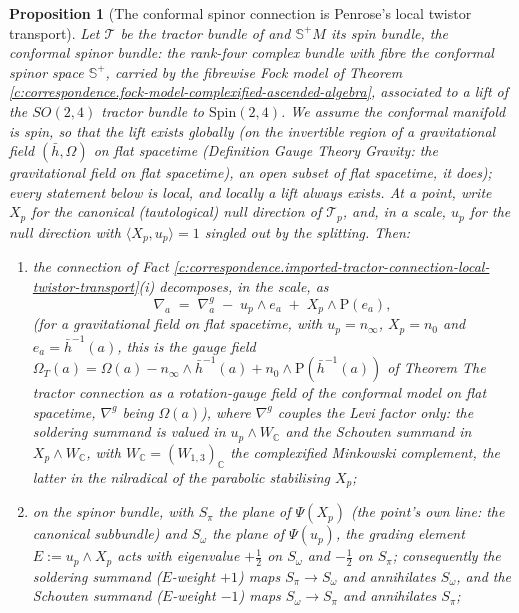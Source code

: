 \documentclass[11pt]{article}
\newtheorem{proposition}[theorem]{Proposition}
\theoremstyle{definition}
\theoremstyle{plain}
\newcommand{\changedmark}[2]{\marginpar{\raggedright\scriptsize\color{#1}#2}}
\providecommand{\C}{}\renewcommand{\C}{\mathbb{C}}
\providecommand{\CS}{}\renewcommand{\CS}{{\mathbb{S}^{+}}}
\providecommand{\Sch}{}\renewcommand{\Sch}{\mathrm{P}}
\providecommand{\Som}{}\renewcommand{\Som}{S_\omega}
\providecommand{\Spi}{}\renewcommand{\Spi}{S_\pi}
\providecommand{\hb}{}\renewcommand{\hb}{\bar{h}}
\providecommand{\nInf}{}\renewcommand{\nInf}{n_\infty}
\providecommand{\nO}{}\renewcommand{\nO}{n_0}
\providecommand{\ip}{}\renewcommand{\ip}[2]{\langle #1, #2\rangle}
\begin{document}
\begin{proposition}[The conformal spinor connection is Penrose's local twistor transport]\label{c:correspondence.local-twistor-transport-ascended-spinor-connection}
\changedmark{gray}{reworded}
Let $\mathcal{T}$ be the tractor bundle of \cite[\S 4]{ButlerT6} and $\CS M$ its spin bundle, the conformal spinor bundle: the rank-four complex bundle with fibre the conformal spinor space $\CS$, carried by the fibrewise Fock model of Theorem \ref{c:correspondence.fock-model-complexified-ascended-algebra}, associated to a lift of the $SO(2,4)$ tractor bundle to $\mathrm{Spin}(2,4)$. We assume the conformal manifold is spin, so that the lift exists globally (on the invertible region of a gravitational field $(\hb, \Omega)$ on flat spacetime (Definition \emph{Gauge Theory Gravity: the gravitational field on flat spacetime}), an open subset of flat spacetime, it does); every statement below is local, and locally a lift always exists. At a point, write $X_p$ for the canonical (tautological) null direction of $\mathcal{T}_p$, and, in a scale, $u_p$ for the null direction with $\ip{X_p}{u_p} = 1$ singled out by the splitting. Then:
\begin{enumerate}
\item the connection of Fact \ref{c:correspondence.imported-tractor-connection-local-twistor-transport}(i) decomposes, in the scale, as
\[
\nabla_a \;=\; \nabla^{g}_a \;-\; u_p \wedge e_a \;+\; X_p \wedge \mathrm{P}(e_a),
\]
(for a gravitational field on flat spacetime, with $u_p = \nInf$, $X_p = \nO$ and $e_a = \hb^{-1}(a)$, this is the gauge field $\Omega_{T}(a) = \Omega(a) - \nInf \wedge \hb^{-1}(a) + \nO \wedge \Sch(\hb^{-1}(a))$ of Theorem \emph{The tractor connection as a rotation-gauge field of the conformal model on flat spacetime}, $\nabla^{g}$ being $\Omega(a)$), where $\nabla^g$ couples the Levi factor only: the soldering summand is valued in $u_p\wedge W_\C$ and the Schouten summand in $X_p \wedge W_\C$, with $W_\C = (W_{1,3})_\C$ the complexified Minkowski complement, the latter in the nilradical of the parabolic stabilising $X_p$;
\item on the spinor bundle, with $\Spi$ the plane of $\Psi(X_p)$ (the point's own line: the canonical subbundle) and $\Som$ the plane of $\Psi(u_p)$, the grading element $E := u_p\wedge X_p$ acts with eigenvalue $+\tfrac12$ on $\Som$ and $-\tfrac12$ on $\Spi$; consequently the soldering summand ($E$-weight $+1$) maps $\Spi \to \Som$ and annihilates $\Som$, and the Schouten summand ($E$-weight $-1$) maps $\Som \to \Spi$ and annihilates $\Spi$;

\end{enumerate}
\end{proposition}
\end{document}
